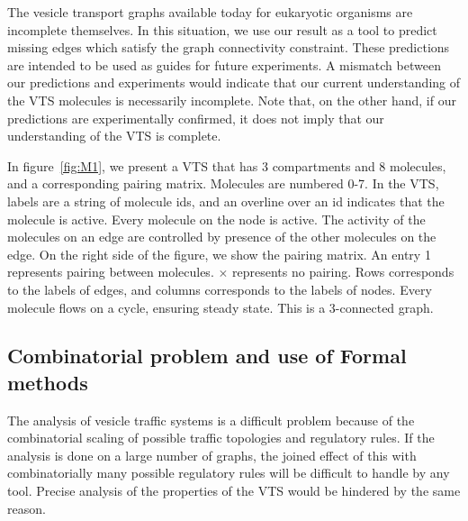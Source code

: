 The vesicle transport graphs available today for eukaryotic organisms are incomplete themselves. 
%
In this situation, we use our result as a tool to predict missing edges which satisfy the graph connectivity constraint. 
%
These predictions are intended to be used as guides for future experiments. 
%
A mismatch between our predictions and experiments would indicate that our current understanding of the VTS molecules is necessarily incomplete. 
%
Note that, on the other hand, if our predictions are experimentally confirmed, it does not imply that our understanding of the VTS is complete.\\
%

\begin{example}
%
In figure~\ref{fig:M1}, we present a VTS that has 3 compartments and 8 molecules, and a corresponding pairing matrix.
%
Molecules are numbered 0-7.
%
In the VTS, labels are a string of molecule ids, and an overline over an id indicates that the molecule is active.
%
Every molecule on the node is active.
%
The activity of the molecules on an edge are controlled
by presence of the other molecules on the edge.
%
On the right side of the figure, we show the pairing matrix.
%
An entry 1 represents pairing between molecules.
%
$\times$ represents no pairing.
%
Rows corresponds to the labels of edges, and
columns corresponds to the labels of nodes.
%
Every molecule flows on a cycle, ensuring steady state.
%
This is a 3-connected graph.
\end{example}
%

\label{subsec:graphmodel}

\subsection{Combinatorial problem and use of Formal methods}
The analysis of vesicle traffic systems is a difficult problem
because of the combinatorial scaling of possible traffic topologies and regulatory rules. 
%
%
If the analysis is done on a large number of graphs, the joined effect of this with combinatorially many possible regulatory rules will be difficult to handle by any tool.
%
Precise analysis of the properties of the VTS would be hindered by the same reason. 

